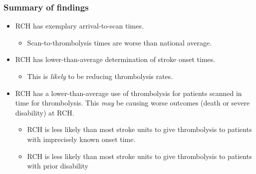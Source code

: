 \begin{frame}
\frametitle{Summary of findings}


\begin{itemize} 

\setlength{\itemsep}{5mm}

    \item RCH has exemplary arrival-to-scan times.

        \begin{itemize}

        \vspace{2mm}

        \setlength{\itemsep}{2mm}
            
            \item Scan-to-thrombolysis times are worse than national average.
                
        
    \end{itemize}
    

    \item RCH has lower-than-average determination of stroke onset times. 
    
    \begin{itemize}

        \vspace{2mm}
        
        \item This is \textit{likely} to be reducing thrombolysis rates.

    \end{itemize}

    \item RCH has a lower-than-average use of thrombolysis for patients scanned in time for thrombolysis. This \textit{may} be causing worse outcomes (death or severe disability) at RCH.

    \begin{itemize}

        \vspace{2mm}

        \setlength{\itemsep}{2mm}
            
        \item RCH is less likely than most stroke units to give thrombolysis to patients with imprecisely known onset time.

        \item RCH is less likely than most stroke units to give thrombolysis to patients with prior disability 
        
    \end{itemize}

    
\end{itemize}


\end{frame}